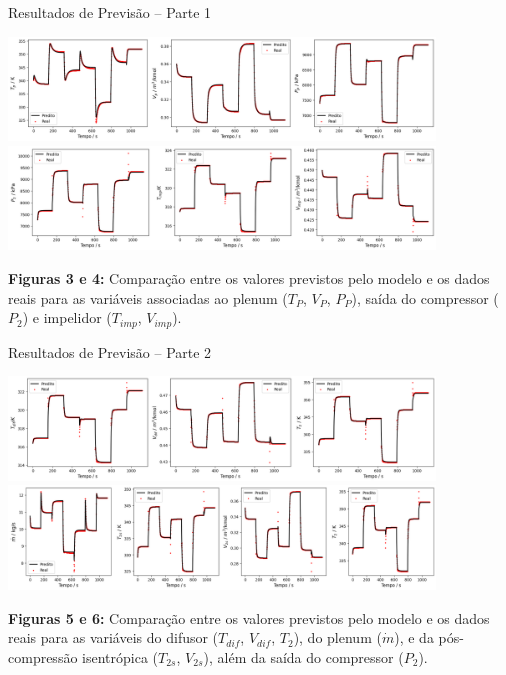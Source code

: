 \begin{frame}{Resultados de Previsão – Parte 1}
\scriptsize

\begin{center}
    \includegraphics[width=0.85\textwidth]{figures/dados1.png} \\
    \includegraphics[width=0.85\textwidth]{figures/dados2.png}
\end{center}

{\centering
\tiny
\textbf{Figuras 3 e 4:} Comparação entre os valores previstos pelo modelo e os dados reais para as variáveis associadas ao plenum (\(T_P\), \(V_P\), \(P_P\)), saída do compressor (\(P_2\)) e impelidor (\(T_{imp}\), \(V_{imp}\)).
}

\end{frame}

\begin{frame}{Resultados de Previsão – Parte 2}
\scriptsize

\begin{center}
    \includegraphics[width=0.85\textwidth]{figures/dados3.png} 
    \includegraphics[width=0.85\textwidth]{figures/dados4.png}
\end{center}



{\centering
\tiny
\textbf{Figuras 5 e 6:} Comparação entre os valores previstos pelo modelo e os dados reais para as variáveis do difusor ($T_{dif}$, $V_{dif}$, $T_2$), do plenum ($\dot{m}$), e da pós-compressão isentrópica ($T_{2s}$, $V_{2s}$), além da saída do compressor ($P_2$).
}

\end{frame}



